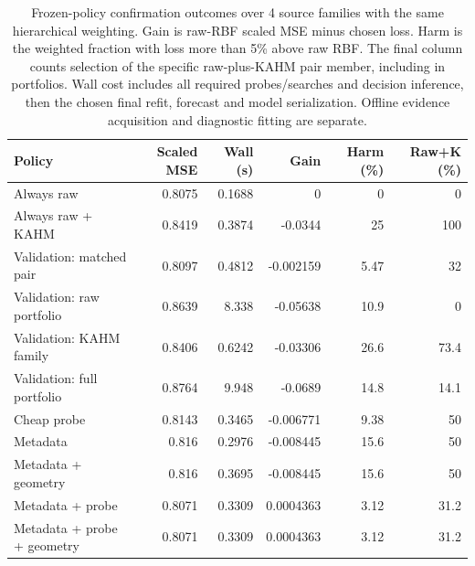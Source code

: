 \begin{table}[t]
\centering\small\setlength{\tabcolsep}{4pt}
\caption{Frozen-policy confirmation outcomes over 4 source families with the same hierarchical weighting. Gain is raw-RBF scaled MSE minus chosen loss. Harm is the weighted fraction with loss more than 5\% above raw RBF. The final column counts selection of the specific raw-plus-KAHM pair member, including in portfolios. Wall cost includes all required probes/searches and decision inference, then the chosen final refit, forecast and model serialization. Offline evidence acquisition and diagnostic fitting are separate.}\label{tab:policy-summary}
\begin{tabular}{lrrrrr}
\toprule
Policy & Scaled MSE & Wall (s) & Gain & Harm (\%) & Raw+K (\%) \\
\midrule
Always raw & 0.8075 & 0.1688 & 0 & 0 & 0 \\
Always raw + KAHM & 0.8419 & 0.3874 & -0.0344 & 25 & 100 \\
Validation: matched pair & 0.8097 & 0.4812 & -0.002159 & 5.47 & 32 \\
Validation: raw portfolio & 0.8639 & 8.338 & -0.05638 & 10.9 & 0 \\
Validation: KAHM family & 0.8406 & 0.6242 & -0.03306 & 26.6 & 73.4 \\
Validation: full portfolio & 0.8764 & 9.948 & -0.0689 & 14.8 & 14.1 \\
Cheap probe & 0.8143 & 0.3465 & -0.006771 & 9.38 & 50 \\
Metadata & 0.816 & 0.2976 & -0.008445 & 15.6 & 50 \\
Metadata + geometry & 0.816 & 0.3695 & -0.008445 & 15.6 & 50 \\
Metadata + probe & 0.8071 & 0.3309 & 0.0004363 & 3.12 & 31.2 \\
Metadata + probe + geometry & 0.8071 & 0.3309 & 0.0004363 & 3.12 & 31.2 \\
\bottomrule
\end{tabular}
\end{table}

